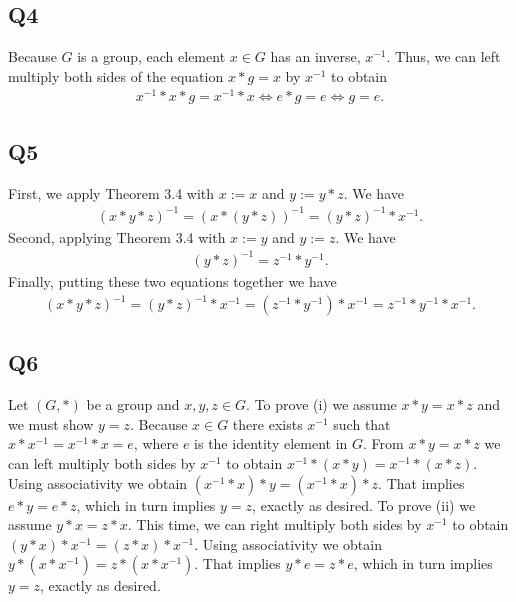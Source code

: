 \documentclass[12pt]{article}
\numberwithin{theorem}{section}
\numberwithin{equation}{section}
\numberwithin{remark}{section}
\numberwithin{definition}{section}
\numberwithin{theorem}{section}
\numberwithin{lemma}{section}
\numberwithin{example}{section}
\begin{document}
\subsection{Q4}

Because $G$ is a group, each element $x\in G$ has an inverse, $x^{-1}$. Thus, we can left multiply both sides of the equation $x*g=x$ by $x^{-1}$ to obtain 
\begin{align*}
	x^{-1}*x*g=x^{-1}*x\iff e*g=e \iff g = e. 
\end{align*}



\subsection{Q5}

First, we apply Theorem 3.4 with $x:=x$ and $y:=y*z$. We have
\begin{align*}
	\left(x*y*z\right)^{-1}=\left(x*(y*z)\right)^{-1}=\left(y*z\right)^{-1}*x^{-1}.
\end{align*}
Second, applying Theorem 3.4 with $x:=y$ and $y:=z$. We have
\begin{align*}
	\left(y*z\right)^{-1}=z^{-1}*y^{-1}.
\end{align*}
Finally, putting these two equations together we have
\begin{align*}
	\left(x*y*z\right)^{-1}=\left(y*z\right)^{-1}*x^{-1}=\left(z^{-1}*y^{-1}\right)*x^{-1}=z^{-1}*y^{-1}*x^{-1}.
\end{align*}



\subsection{Q6}

Let $(G,*)$ be a group and $x,y,z\in G$. To prove (i) we assume $x*y=x*z$ and we must show $y=z$. Because $x\in G$ there exists $x^{-1}$ such that $x*x^{-1}=x^{-1}*x=e$, where $e$ is the identity element in $G$. From $x*y=x*z$ we can left multiply both sides by $x^{-1}$ to obtain $x^{-1}*(x*y)=x^{-1}*(x*z)$. Using associativity we obtain $(x^{-1}*x)*y=(x^{-1}*x)*z$. That implies $e*y=e*z$, which in turn implies $y=z$, exactly as desired. To prove (ii) we assume $y*x=z*x$. This time, we can right multiply both sides by $x^{-1}$ to obtain $(y*x)*x^{-1}=(z*x)*x^{-1}$. Using associativity we obtain $y*(x*x^{-1})=z*(x*x^{-1})$. That implies $y*e=z*e$, which in turn implies $y=z$, exactly as desired. 
\end{document}
